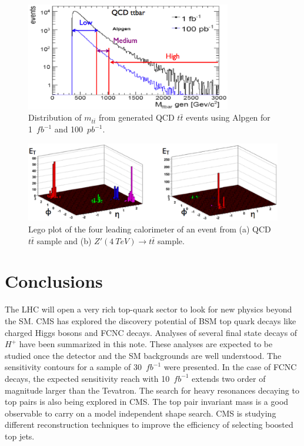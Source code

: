 \documentclass{cimento}
\begin{document}
\begin{figure}
\centering
\includegraphics[width=0.8\textwidth]{fig05.ps}
\caption{Distribution of $m_{t\bar{t}}$ from generated QCD $t\bar{t}$ events using Alpgen for
1~$fb^{-1}$ and 100~$pb^{-1}$.}
\label{fig:fig5}
\end{figure}

\begin{figure}
\centering
\includegraphics[width=1.1\textwidth]{fig07.ps}
\caption{Lego plot of the four leading calorimeter of an event from (a) QCD $t\bar{t}$ sample and (b) $Z'(4~TeV)\rightarrow t\bar{t}$ sample.}
\label{fig:fig7}
\end{figure}

\section{Conclusions}
\label{sec:Conclusions}

The LHC will open a very rich top-quark sector to look for new physics beyond the SM.
CMS has explored the discovery potential of BSM top quark decays like charged Higgs
bosons and FCNC decays. Analyses of several final state decays of $H^{+}$ have
been summarized in this note. These analyses are expected to be studied once the
detector and the SM backgrounds are well understood. The sensitivity contours for a sample
of 30~$fb^{-1}$ were presented. In the case of FCNC decays, the expected sensitivity
reach with 10~$fb^{-1}$ extends two order of magnitude larger than the Tevatron.
The search for heavy resonances decaying to top pairs is also being explored in CMS. The
top pair invariant mass is a good observable to carry on a model independent shape
search. CMS is studying different reconstruction techniques to improve the efficiency
of selecting boosted top jets.
\end{document}
